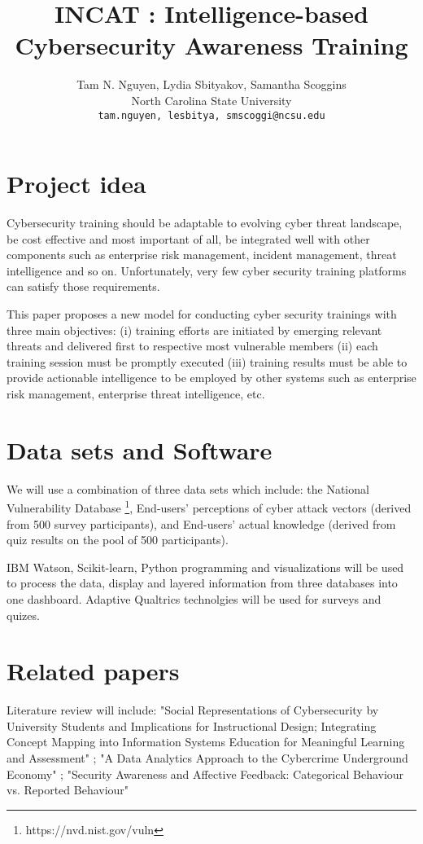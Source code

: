\documentclass{article} %
\title{INCAT : Intelligence-based Cybersecurity Awareness Training}
\author{
Tam N. Nguyen, Lydia Sbityakov, Samantha Scoggins\\
North Carolina State University\\
\texttt{tam.nguyen, lesbitya, smscoggi@ncsu.edu} \\
}
\begin{document}
\maketitle

\section{Project idea}
Cybersecurity training should be adaptable to evolving cyber threat landscape, be cost effective and most important of all, be integrated well with other components such as enterprise risk management, incident management, threat intelligence and so on. Unfortunately, very few cyber security training platforms can satisfy those requirements.

This paper proposes a new model for conducting cyber security trainings with three main objectives: (i) training efforts are initiated by emerging relevant threats and delivered first to respective most vulnerable members (ii) each training session must be
promptly executed (iii) training results must be able to provide actionable intelligence to be employed by other systems such as enterprise risk management, enterprise threat intelligence, etc.

\section{Data sets and Software}
We will use a combination of three data sets which include: the National Vulnerability Database \footnote{https://nvd.nist.gov/vuln}, End-users' perceptions of cyber attack vectors (derived from 500 survey participants), and End-users' actual knowledge (derived from quiz results on the pool of 500 participants).

IBM Watson, Scikit-learn, Python programming and visualizations will be used to process the data, display and layered information from three databases into one dashboard. Adaptive Qualtrics technolgies will be used for surveys and quizes.

\section{Related papers}
Literature review will include: "Social Representations of Cybersecurity by University Students and Implications for Instructional Design; Integrating Concept Mapping into Information Systems Education for Meaningful Learning and Assessment" ; "A Data Analytics Approach to the Cybercrime Underground Economy" ; "Security Awareness and Affective Feedback: Categorical Behaviour vs. Reported Behaviour"
\end{document}
